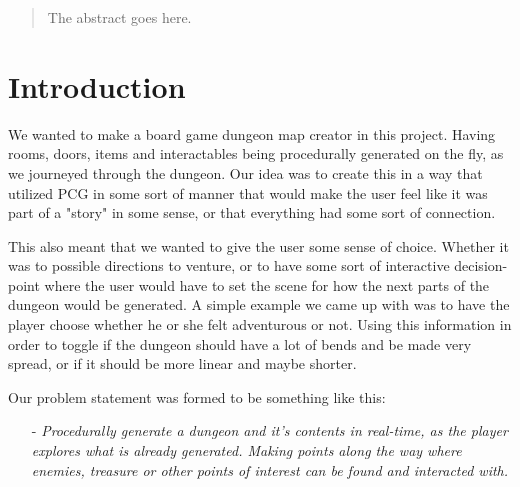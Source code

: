 \documentclass[conference,compsoc]{IEEEtran}
\begin{document}




\maketitle

\begin{abstract}
The abstract goes here.
\end{abstract}





%
\IEEEpeerreviewmaketitle



\section{Introduction}
We wanted to make a board game dungeon map creator in this project. Having rooms, doors, items and interactables being procedurally generated on the fly, as we journeyed through the dungeon. 
Our idea was to create this in a way that utilized PCG in some sort of manner that would make the user feel like it was part of a "story" in some sense, or that everything had some sort of connection. 

This also meant that we wanted to give the user some sense of choice. Whether it was to possible directions to venture, or to have some sort of interactive decision-point where the user would have to set the scene for how the next parts of the dungeon would be generated. A simple example we came up with was to have the player choose whether he or she felt adventurous or not. Using this information in order to toggle if the dungeon should have a lot of bends and be made very spread, or if it should be more linear and maybe shorter.

Our problem statement was formed to be something like this:
\begin{itemize}
\item[-] \textit{Procedurally generate a dungeon and it's contents in real-time, as the player explores what is already generated. Making points along the way where enemies, treasure or other points of interest can be found and interacted with.}
\end{itemize}
\end{document}
